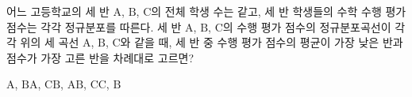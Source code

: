 \noindent\begin{minipage}[t]{0.58\linewidth}\vspace{0pt}\raggedright 어느 고등학교의 세 반 $\mathrm{A}$, $\mathrm{B}$, $\mathrm{C}$의 전체 학생 수는 같고, 세 반 학생들의 수학 수행 평가 점수는 각각 정규분포를 따른다. 세 반 $\mathrm{A}$, $\mathrm{B}$, $\mathrm{C}$의 수행 평가 점수의 정규분포곡선이 각각 위의 세 곡선 $\mathrm{A}$, $\mathrm{B}$, $\mathrm{C}$와 같을 때, 세 반 중 수행 평가 점수의 평균이 가장 낮은 반과 점수가 가장 고른 반을 차례대로 고르면?\end{minipage}\hfill\begin{minipage}[t]{0.4\linewidth}\vspace{0pt}\centering \resizebox{\ifdim\width>\linewidth\linewidth\else\width\fi}{!}{}\end{minipage}\par
\begin{choices32}{$\mathrm{A}$, $\mathrm{B}$}{$\mathrm{A}$, $\mathrm{C}$}{$\mathrm{B}$, $\mathrm{A}$}{$\mathrm{B}$, $\mathrm{C}$}{$\mathrm{C}$, $\mathrm{B}$}\end{choices32}
